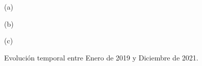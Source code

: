 \documentclass[12pt,twoside]{article} %
\begin{document}



\begin{figure}[H]

  \begin{minipage}[t]{1.0\linewidth}\centering
    \centerline{}
    \medskip
    \centerline{(a)}
  \end{minipage}\hfill

  \begin{minipage}[t]{1.0\linewidth}\centering
    \centerline{}
    \medskip
    \centerline{(b)}
  \end{minipage}

  \bigskip

  \begin{minipage}[t]{1.0\linewidth}\centering
    \centerline{}
    \medskip
    \centerline{(c)}
  \end{minipage}\hfill


  \caption{Evolución temporal entre Enero de 2019 y Diciembre de 2021.}
  \label{fig:1}
\end{figure}

\parskip=0pt
\parsep=0pt



\end{document}
